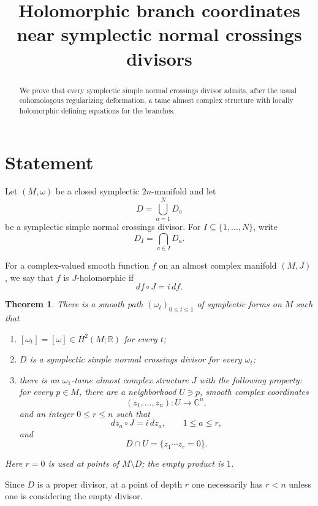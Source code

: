 \documentclass[11pt]{article}
\newtheorem{theorem}{Theorem}[section]
\theoremstyle{definition}
\theoremstyle{remark}
\newcommand{\cC}{\mathbb{C}}
\begin{document}
\title{Holomorphic branch coordinates near symplectic normal crossings divisors}
\author{}
\date{}
\maketitle

\begin{abstract}
We prove that every symplectic simple normal crossings divisor admits, after the
usual cohomologous regularizing deformation, a tame almost complex structure
with locally holomorphic defining equations for the branches.
\end{abstract}

\section{Statement}

Let \((M,\omega)\) be a closed symplectic \(2n\)-manifold and let
\[
D=\bigcup_{a=1}^{N}D_a
\]
be a symplectic simple normal crossings divisor. For
\(I\subseteq\{1,\ldots,N\}\), write
\[
D_I=\bigcap_{a\in I}D_a .
\]

For a complex-valued smooth function \(f\) on an almost complex manifold
\((M,J)\), we say that \(f\) is \(J\)-holomorphic if
\[
df\circ J=i\,df .
\]

\begin{theorem}\label{thm:main}
There is a smooth path \((\omega_t)_{0\leq t\leq1}\) of symplectic forms on \(M\)
such that
\begin{enumerate}
\item \([\omega_t]=[\omega]\in H^2(M;\mathbb R)\) for every \(t\);
\item \(D\) is a symplectic simple normal crossings divisor for every
\(\omega_t\);
\item there is an \(\omega_1\)-tame almost complex structure \(J\) with the
following property: for every \(p\in M\), there are a neighborhood \(U\ni p\),
smooth complex coordinates
\[
(z_1,\ldots,z_n):U\longrightarrow \cC^n,
\]
and an integer \(0\leq r\leq n\) such that
\[
dz_a\circ J=i\,dz_a,\qquad 1\leq a\leq r,
\]
and
\[
D\cap U=\{z_1\cdots z_r=0\}.
\]
\end{enumerate}
Here \(r=0\) is used at points of \(M\setminus D\); the empty product is \(1\).
\end{theorem}

Since \(D\) is a proper divisor, at a point of depth \(r\) one necessarily has
\(r<n\) unless one is considering the empty divisor.
\end{document}
